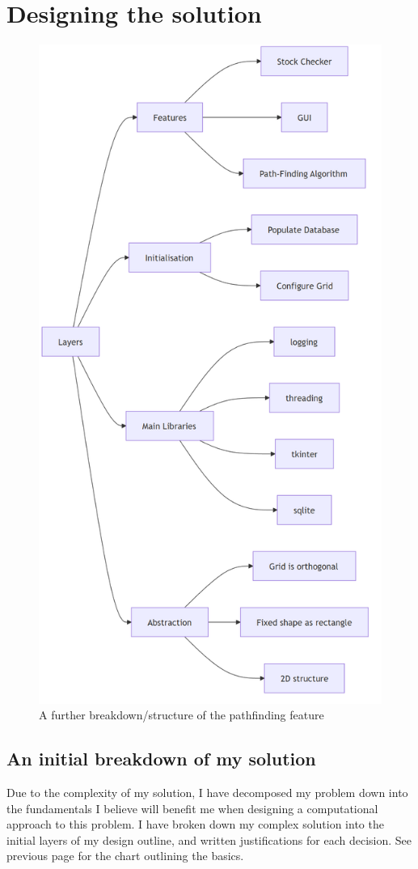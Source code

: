 
\chapter{Designing the solution}

\begin{figure}[!htbp]
	\centering
	\includegraphics[width=0.5\linewidth]{Images/breakdown1.png}
	\caption{A further breakdown/structure of the pathfinding feature}
\end{figure}

\section{An initial breakdown of my solution}

Due to the complexity of my solution, I have decomposed my problem down into the fundamentals I believe will benefit me when designing a computational approach to this problem. I have broken down my complex solution into the initial layers of my design outline, and written justifications for each decision. See previous page for the chart outlining the basics.

